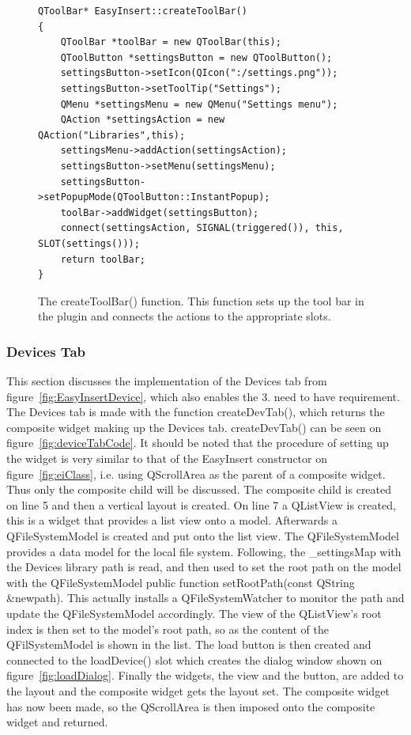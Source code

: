 \begin{figure}[h] %
\centering
\lstset{language=C++} 
\begin{lstlisting}[frame=single] 
QToolBar* EasyInsert::createToolBar()
{ 
	QToolBar *toolBar = new QToolBar(this);
	QToolButton *settingsButton = new QToolButton();
	settingsButton->setIcon(QIcon(":/settings.png"));
	settingsButton->setToolTip("Settings");
	QMenu *settingsMenu = new QMenu("Settings menu");
	QAction *settingsAction = new QAction("Libraries",this);
	settingsMenu->addAction(settingsAction);
	settingsButton->setMenu(settingsMenu);
	settingsButton->setPopupMode(QToolButton::InstantPopup);
	toolBar->addWidget(settingsButton);
	connect(settingsAction, SIGNAL(triggered()), this, SLOT(settings()));
	return toolBar;
}
\end{lstlisting}
\caption{The createToolBar() function. This function sets up the tool bar in the plugin and connects the actions to the appropriate slots.}
\label{fig:settingsToolBarCode} 	
\end{figure}

\subsubsection{Devices Tab}
\label{sec:DeviceTab}
This section discusses the implementation of the Devices tab from figure~\ref{fig:EasyInsertDevice}, which also enables the 3. need to have requirement. The Devices tab is made with the function createDevTab(), which returns the composite widget making up the Devices tab. createDevTab() can be seen on figure~\ref{fig:deviceTabCode}.
It should be noted that the procedure of setting up the widget is very similar to that of the EasyInsert constructor on figure~\ref{fig:eiClass}, i.e. using QScrollArea as the parent of a composite widget. Thus only the composite child will be discussed.  The composite child is created on line 5 and then a vertical layout is created. On line 7 a QListView is created, this is a widget that provides a list view onto a model. Afterwards a QFileSystemModel is created and put onto the list view. The QFileSystemModel provides a data model for the local file system. Following, the \_settingsMap with the Devices library path is read, and then used to set the root path on the model with the QFileSystemModel public function setRootPath(const QString \&newpath). This actually installs a QFileSystemWatcher to monitor the path and update the QFileSystemModel accordingly. The view of the QListView's root index is then set to the model's root path, so as the content of the QFilSystemModel is shown in the list. The load button is then created and connected to the loadDevice() slot which creates the dialog window shown on figure~\ref{fig:loadDialog}. Finally the widgets, the view and the button, are added to the layout and the composite widget gets the layout set. The composite widget has now been made, so the QScrollArea is then imposed onto the composite widget and returned. 

